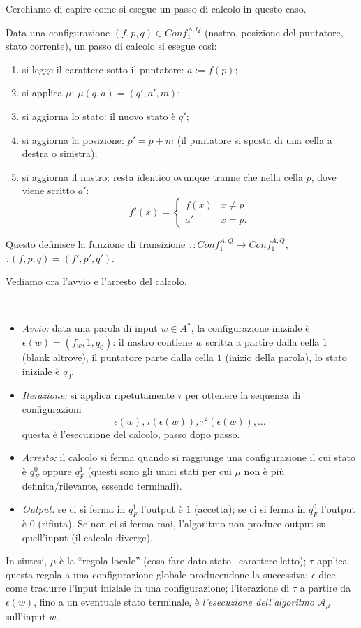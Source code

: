 Cerchiamo di capire come si esegue un passo di calcolo in questo caso.
\begin{rema}
Data una configurazione $(f,p,q) \in Conf_1^{A,Q}$ (nastro, posizione del puntatore, stato corrente), un passo di calcolo si esegue così:
\begin{enumerate}
\item si legge il carattere sotto il puntatore: $a := f(p)$;
\item si applica $\mu$: $\mu(q,a) = (q',a',m)$;
\item si aggiorna lo stato: il nuovo stato è $q'$;
\item si aggiorna la posizione: $p' = p+m$ (il puntatore si sposta di una cella a destra o sinistra);
\item si aggiorna il nastro: resta identico ovunque tranne che nella cella $p$, dove viene scritto $a'$:
\[
f'(x) = \begin{cases} f(x) & x \neq p \\ a' & x = p. \end{cases}
\]
\end{enumerate}
Questo definisce la funzione di transizione $\tau : Conf_1^{A,Q}\to Conf_1^{A,Q}$, $\tau(f,p,q)=(f',p',q')$.

\end{rema}
Vediamo ora l'avvio e l'arresto del calcolo.
\begin{rema}\
\begin{itemize}
\item \emph{Avvio:} data una parola di input $w \in A^*$, la configurazione iniziale è $\epsilon(w) = (f_w, 1, q_0)$: il nastro contiene $w$ scritta a partire dalla cella $1$ (blank altrove), il puntatore parte dalla cella $1$ (inizio della parola), lo stato iniziale è $q_0$.
\item \emph{Iterazione:} si applica ripetutamente $\tau$ per ottenere la sequenza di configurazioni $$\epsilon(w), \tau(\epsilon(w)), \tau^2(\epsilon(w)), \dots$$  questa è l'esecuzione del calcolo, passo dopo passo.
\item \emph{Arresto:} il calcolo si ferma quando si raggiunge una configurazione il cui stato è $q_F^0$ oppure $q_F^1$ (questi sono gli unici stati per cui $\mu$ non è più definita/rilevante, essendo terminali).
\item \emph{Output:} se ci si ferma in $q_F^1$ l'output è $1$ (accetta); se ci si ferma in $q_F^0$ l'output è $0$ (rifiuta). Se non ci si ferma mai, l'algoritmo non produce output su quell'input (il calcolo diverge).
\end{itemize}
In sintesi, $\mu$ è la ``regola locale'' (cosa fare dato stato+carattere letto); $\tau$ applica questa regola a una configurazione globale producendone la successiva; $\epsilon$ dice come tradurre l'input iniziale in una configurazione; l'iterazione di $\tau$ a partire da $\epsilon(w)$, fino a un eventuale stato terminale, è \emph{l'esecuzione dell'algoritmo} $\mathcal{A}_\mu$ sull'input $w$.
\end{rema}

